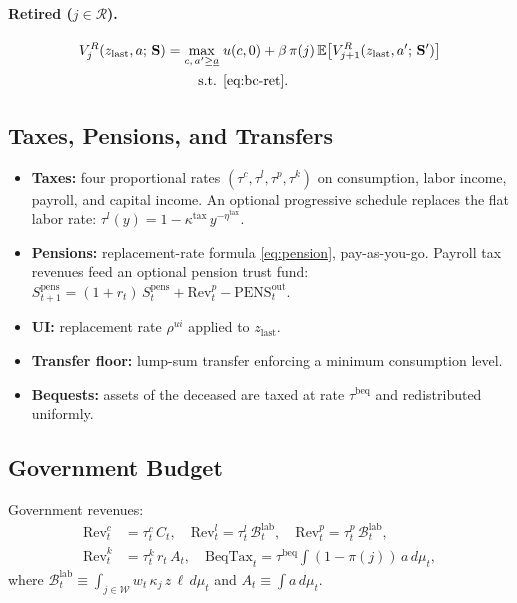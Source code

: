 \paragraph{Retired ($j \in \mathcal{R}$).}
\begin{align*}
V_j^R(z_{\text{last}}, a;\,\mathbf{S}) = \max_{c,\,a' \geq \underline{a}} \;& u(c,0) + \beta\,\pi(j)\,\mathbb{E}\bigl[V_{j+1}^R(z_{\text{last}}, a';\,\mathbf{S}')\bigr] \\
\text{s.t. } & \eqref{eq:bc-ret}.
\end{align*}

\subsection{Taxes, Pensions, and Transfers}
\begin{itemize}[leftmargin=*]
    \item \textbf{Taxes:} four proportional rates $(\tau^c, \tau^l, \tau^p, \tau^k)$ on consumption, labor income, payroll, and capital income. An optional progressive schedule replaces the flat labor rate: $\tau^l(y) = 1 - \kappa^{\text{tax}}\,y^{-\eta^{\text{tax}}}$.
    \item \textbf{Pensions:} replacement-rate formula \eqref{eq:pension}, pay-as-you-go. Payroll tax revenues feed an optional pension trust fund: $S_{t+1}^{\text{pens}} = (1+r_t)\,S_t^{\text{pens}} + \text{Rev}_t^p - \text{PENS}_t^{\text{out}}$.
    \item \textbf{UI:} replacement rate $\rho^{ui}$ applied to $z_{\text{last}}$.
    \item \textbf{Transfer floor:} lump-sum transfer enforcing a minimum consumption level.
    \item \textbf{Bequests:} assets of the deceased are taxed at rate $\tau^{\text{beq}}$ and redistributed uniformly.
\end{itemize}

\subsection{Government Budget}\label{sec:gov-budget}
Government revenues:
\begin{align*}
\text{Rev}_t^c &= \tau_t^c\,C_t, \quad
\text{Rev}_t^l = \tau_t^l\,\mathcal{B}_t^{\text{lab}}, \quad
\text{Rev}_t^p = \tau_t^p\,\mathcal{B}_t^{\text{lab}}, \\
\text{Rev}_t^k &= \tau_t^k\,r_t\,A_t, \quad
\text{BeqTax}_t = \tau^{\text{beq}}\int (1-\pi(j))\,a\,d\mu_t,
\end{align*}
where $\mathcal{B}_t^{\text{lab}} \equiv \int_{j\in\mathcal{W}} w_t\,\kappa_j\,z\,\ell\,d\mu_t$ and $A_t \equiv \int a\,d\mu_t$.

